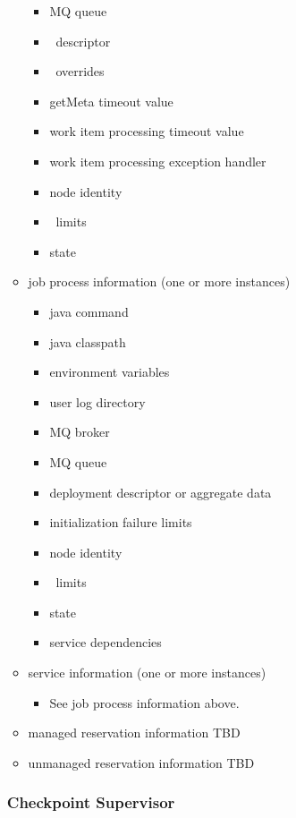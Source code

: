 \begin{itemize}
\begin{itemize}
\begin{itemize}
          \item MQ queue
          \item \varCollectionReader~descriptor
          \item \varCollectionReader~overrides
          \item getMeta timeout value
          \item work item processing timeout value
          \item work item processing exception handler
          \item node identity
          \item \varLinuxControlGroup~limits
          \item state
        \end{itemize} 
      \item job process information (one or more instances)
        \begin{itemize}
          \item java command
          \item java classpath
          \item environment variables
          \item user log directory
          \item MQ broker
          \item MQ queue
          \item deployment descriptor or aggregate data
          \item initialization failure limits
          \item node identity
          \item \varLinuxControlGroup~limits
          \item state
          \item service dependencies
        \end{itemize} 
      \item service information (one or more instances)
        \begin{itemize}
          \item See job process information above.
        \end{itemize} 
      \item managed reservation information
        TBD      
      \item unmanaged reservation information
        TBD          
    \end{itemize} 
    
    \subsubsection{Checkpoint Supervisor} 
    

\end{itemize}
